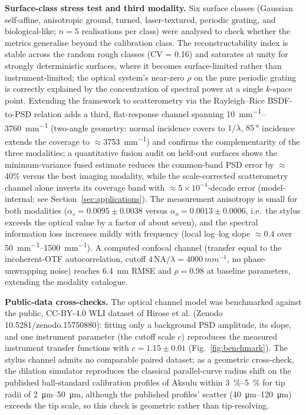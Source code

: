 \documentclass{imeko_wc}
\begin{document}
\textbf{Surface-class stress test and third modality.} Six surface classes (Gaussian self-affine, anisotropic ground, turned, laser-textured, periodic grating, and biological-like; $n=5$ realisations per class) were analysed to check whether the metrics generalise beyond the calibration class. The reconstructability index is stable across the random rough classes (CV = 0.16) and saturates at unity for strongly deterministic surfaces, where it becomes surface-limited rather than instrument-limited; the optical system's near-zero $\rho$ on the pure periodic grating is correctly explained by the concentration of spectral power at a single $k$-space point. Extending the framework to scatterometry via the Rayleigh--Rice BSDF-to-PSD relation adds a third, flat-response channel spanning \qtyrange{10}{3760}{mm^{-1}} (two-angle geometry: normal incidence covers to $1/\lambda$, $\qty{85}{\degree}$ incidence extends the coverage to $\approx$\qty{3753}{mm^{-1}}) and confirms the complementarity of the three modalities; a quantitative fusion audit on held-out surfaces shows the minimum-variance fused estimate reduces the common-band PSD error by $\approx$40\% versus the best imaging modality, while the scale-corrected scatterometry channel alone inverts its coverage band with $\approx5\times10^{-4}$-decade error (model-internal; see Section~\ref{sec:applications}). The measurement anisotropy is small for both modalities ($\alpha_s = 0.0095 \pm 0.0038$ versus $\alpha_o = 0.0013 \pm 0.0006$, i.e.\ the stylus exceeds the optical value by a factor of about seven), and the spectral information loss increases mildly with frequency (local log--log slope $\approx 0.4$ over \qtyrange{50}{1500}{mm^{-1}}). A computed confocal channel (transfer equal to the incoherent-OTF autocorrelation, cutoff $4\,\mathrm{NA}/\lambda = \qty{4000}{mm^{-1}}$, no phase-unwrapping noise) reaches \qty{6.4}{\nano\metre} RMSE and $\rho = 0.98$ at baseline parameters, extending the modality catalogue.

\textbf{Public-data cross-checks.} The optical channel model was benchmarked against the public, CC-BY-4.0 WLI dataset of Hirose et al. \cite{hirose2025topography} (Zenodo 10.5281/zenodo.15750880): fitting only a background PSD amplitude, its slope, and one instrument parameter (the cutoff scale $c$) reproduces the measured instrument transfer functions with $c = 1.15 \pm 0.01$ (Fig.~\ref{fig:benchmark}). The stylus channel admits no comparable paired dataset; as a geometric cross-check, the dilation simulator reproduces the classical parallel-curve radius shift on the published ball-standard calibration profiles of Aksulu \cite{aksulu2021stylus} within \qtyrange{3}{5}{\percent} for tip radii of \qtyrange{2}{50}{\micro\metre}, although the published profiles' scatter (\qtyrange{40}{120}{\micro\metre}) exceeds the tip scale, so this check is geometric rather than tip-resolving.
\end{document}
